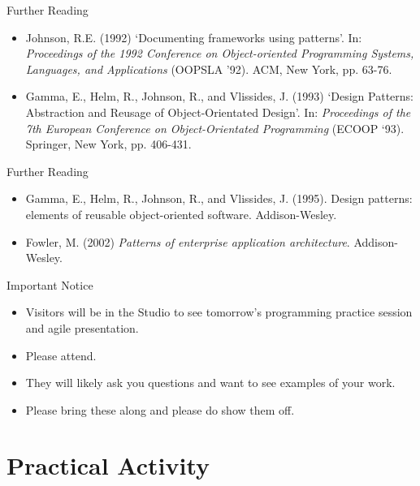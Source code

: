 \begin{frame}{Further Reading}
	\begin{itemize}
		\item Johnson, R.E. (1992) `Documenting frameworks using patterns'. In: \textit{Proceedings of the 1992 Conference on 
		Object-oriented Programming Systems, Languages, and Applications} (OOPSLA '92). ACM, New York, pp. 63-76.
		\vspace{1ex}
		\item Gamma, E., Helm, R., Johnson, R., and Vlissides, J. (1993) `Design Patterns: Abstraction and Reusage of
		Object-Orientated Design'. In: \textit{Proceedings of the 7th European Conference on Object-Orientated Programming}
		(ECOOP `93). Springer, New York, pp. 406-431.
	\end{itemize}
\end{frame}

\begin{frame}{Further Reading}
	\begin{itemize}
		\item Gamma, E., Helm, R., Johnson, R., and Vlissides, J. (1995). Design patterns: elements of reusable object-oriented software. Addison-Wesley.
		\vspace{2ex}
		\item Fowler, M. (2002) \textit{Patterns of enterprise application architecture}. Addison-Wesley.
	\end{itemize}
\end{frame}

\begin{frame}{Important Notice}
	\begin{itemize}
		\item Visitors will be in the Studio to see tomorrow's programming practice session and agile presentation.
		\item Please attend.
		\item They will likely ask you questions and want to see examples of your work.
		\item Please bring these along and please do show them off.
	\end{itemize}
\end{frame}



\part{Practical Activity}
\frame{\partpage}

